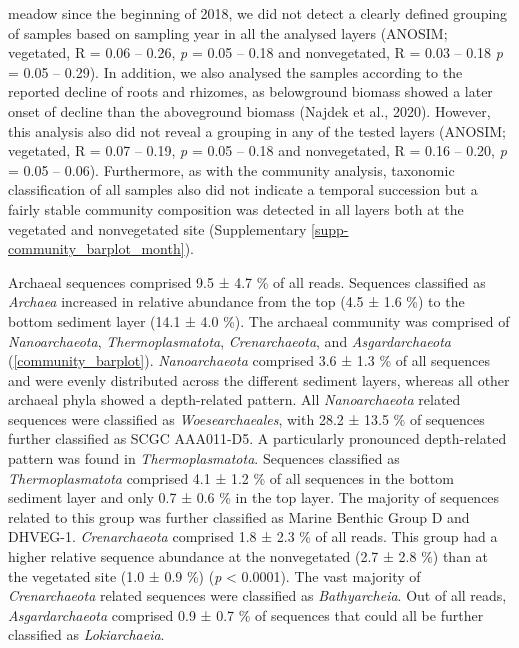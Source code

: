 \documentclass[12pt,]{article}
\begin{document}
meadow since the beginning of 2018, we did not detect a clearly defined
grouping of samples based on sampling year in all the analysed layers
(ANOSIM; vegetated, R = 0.06 -- 0.26, \emph{p} = 0.05 -- 0.18 and
nonvegetated, R = 0.03 -- 0.18 \emph{p} = 0.05 -- 0.29). In addition, we
also analysed the samples according to the reported decline of roots and
rhizomes, as belowground biomass showed a later onset of decline than
the aboveground biomass (Najdek et al., 2020). However, this analysis
also did not reveal a grouping in any of the tested layers (ANOSIM;
vegetated, R = 0.07 -- 0.19, \emph{p} = 0.05 -- 0.18 and nonvegetated, R
= 0.16 -- 0.20, \emph{p} = 0.05 -- 0.06). Furthermore, as with the
community analysis, taxonomic classification of all samples also did not
indicate a temporal succession but a fairly stable community composition
was detected in all layers both at the vegetated and nonvegetated site
(Supplementary \autoref{supp-community_barplot_month}).

Archaeal sequences comprised 9.5 ± 4.7 \si{\percent} of all reads.
Sequences classified as \emph{Archaea} increased in relative abundance
from the top (4.5 ± 1.6 \si{\percent}) to the bottom sediment layer
(14.1 ± 4.0 \si{\percent}). The archaeal community was comprised of
\emph{Nanoarchaeota}, \emph{Thermoplasmatota}, \emph{Crenarchaeota}, and
\emph{Asgardarchaeota} (\autoref{community_barplot}).
\emph{Nanoarchaeota} comprised 3.6 ± 1.3 \si{\percent} of all sequences
and were evenly distributed across the different sediment layers,
whereas all other archaeal phyla showed a depth-related pattern. All
\emph{Nanoarchaeota} related sequences were classified as
\emph{Woesearchaeales}, with 28.2 ± 13.5 \si{\percent} of sequences
further classified as SCGC AAA011-D5. A particularly pronounced
depth-related pattern was found in \emph{Thermoplasmatota}. Sequences
classified as \emph{Thermoplasmatota} comprised 4.1 ± 1.2 \si{\percent}
of all sequences in the bottom sediment layer and only 0.7 ± 0.6
\si{\percent} in the top layer. The majority of sequences related to
this group was further classified as Marine Benthic Group D and DHVEG-1.
\emph{Crenarchaeota} comprised 1.8 ± 2.3 \si{\percent} of all reads.
This group had a higher relative sequence abundance at the nonvegetated
(2.7 ± 2.8 \si{\percent}) than at the vegetated site (1.0 ± 0.9
\si{\percent}) (\emph{p} \textless{} 0.0001). The vast majority of
\emph{Crenarchaeota} related sequences were classified as
\emph{Bathyarcheia}. Out of all reads, \emph{Asgardarchaeota} comprised
0.9 ± 0.7 \si{\percent} of sequences that could all be further
classified as \emph{Lokiarchaeia}.
\end{document}
